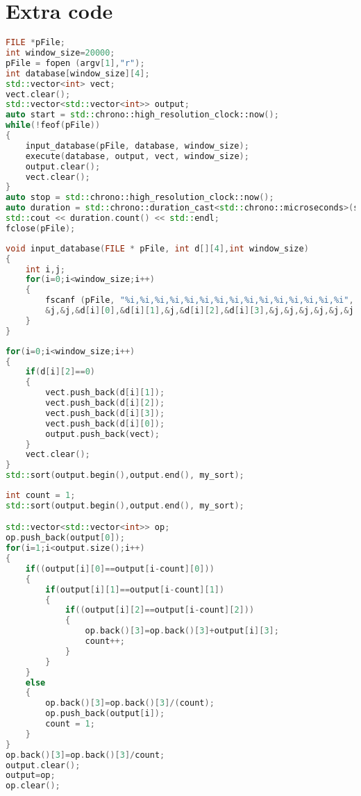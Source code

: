 \chapter{Extra code}
\label{appendix}
\thispagestyle{myheadings}

\begin{lstlisting}[language=C++, caption= code overview, label={lst:simple_query_overview}]
FILE *pFile;
int window_size=20000;
pFile = fopen (argv[1],"r");
int database[window_size][4];
std::vector<int> vect;
vect.clear();
std::vector<std::vector<int>> output;
auto start = std::chrono::high_resolution_clock::now();
while(!feof(pFile))
{
    input_database(pFile, database, window_size);
    execute(database, output, vect, window_size);
    output.clear();
    vect.clear();
}
auto stop = std::chrono::high_resolution_clock::now(); 
auto duration = std::chrono::duration_cast<std::chrono::microseconds>(stop - start);
std::cout << duration.count() << std::endl;
fclose(pFile);
\end{lstlisting}

\begin{lstlisting}[language=C++, caption= input function, label={lst:simple_query_input}]
void input_database(FILE * pFile, int d[][4],int window_size)
{
    int i,j;
    for(i=0;i<window_size;i++)
    {
        fscanf (pFile, "%i,%i,%i,%i,%i,%i,%i,%i,%i,%i,%i,%i,%i,%i,%i", &j,
        &j,&j,&d[i][0],&d[i][1],&j,&d[i][2],&d[i][3],&j,&j,&j,&j,&j,&j,&j);
    }
}
\end{lstlisting}

\begin{lstlisting}[language=C++, caption= groupby, label={lst:simple_query_groupby}]
for(i=0;i<window_size;i++)
{
    if(d[i][2]==0)
    {
        vect.push_back(d[i][1]);
        vect.push_back(d[i][2]);
        vect.push_back(d[i][3]);
        vect.push_back(d[i][0]);
        output.push_back(vect);
    }
    vect.clear();
}
std::sort(output.begin(),output.end(), my_sort);
\end{lstlisting}

\begin{lstlisting}[language=C++, caption= aggregation, label={lst:simple_query_aggregation}]
int count = 1;
std::sort(output.begin(),output.end(), my_sort);

std::vector<std::vector<int>> op;
op.push_back(output[0]);
for(i=1;i<output.size();i++)
{
    if((output[i][0]==output[i-count][0]))
    {
        if(output[i][1]==output[i-count][1])
        {
            if((output[i][2]==output[i-count][2]))
            {    
                op.back()[3]=op.back()[3]+output[i][3];
                count++;
            }
        }
    }
    else
    {
        op.back()[3]=op.back()[3]/(count);
        op.push_back(output[i]);
        count = 1;
    }
}
op.back()[3]=op.back()[3]/count;
output.clear();
output=op;
op.clear();
\end{lstlisting}


